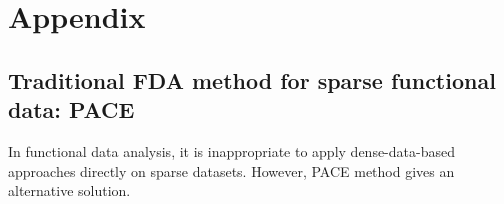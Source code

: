 \documentclass{article}
\begin{document}


\section{Appendix}
\subsection{Traditional FDA method for sparse functional data: PACE \cite{yao2005functional}} 
\label{PACE}
In functional data analysis, it is inappropriate to apply dense-data-based approaches directly on sparse datasets.
However, PACE method gives an alternative solution.
\end{document}
